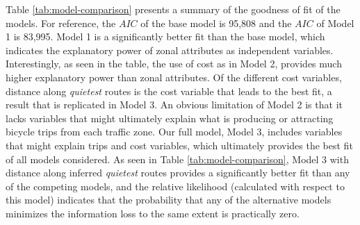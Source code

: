 \documentclass[smallextended]{svjour3}       %
\begin{document}
Table \ref{tab:model-comparison} presents a summary of the goodness of
fit of the models. For reference, the \(AIC\) of the base model is
95,808 and the \(AIC\) of Model 1 is 83,995. Model 1 is a significantly
better fit than the base model, which indicates the explanatory power of
zonal attributes as independent variables. Interestingly, as seen in the
table, the use of cost as in Model 2, provides much higher explanatory
power than zonal attributes. Of the different cost variables, distance
along \emph{quietest} routes is the cost variable that leads to the best
fit, a result that is replicated in Model 3. An obvious limitation of
Model 2 is that it lacks variables that might ultimately explain what is
producing or attracting bicycle trips from each traffic zone. Our full
model, Model 3, includes variables that might explain trips and cost
variables, which ultimately provides the best fit of all models
considered. As seen in Table \ref{tab:model-comparison}, Model 3 with
distance along inferred \emph{quietest} routes provides a significantly
better fit than any of the competing models, and the relative likelihood
(calculated with respect to this model) indicates that the probability
that any of the alternative models minimizes the information loss to the
same extent is practically zero.
\end{document}
